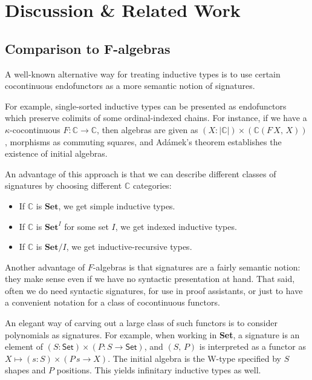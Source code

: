 \documentclass[12pt,a4paper,twoside,openany]{book}
\theoremstyle{remark}
\theoremstyle{definition}
\theoremstyle{theorem}
\newcommand{\mbb}[1]{\mathbb{#1}}
\newcommand{\mbf}[1]{\mathbf{#1}}
\newcommand{\Set}{\mathsf{Set}}
\begin{document}
\section{Discussion \& Related Work}

\subsection{Comparison to F-algebras}

A well-known alternative way for treating inductive types is to use certain
cocontinuous endofunctors as a more semantic notion of signatures.

For example, single-sorted inductive types can be presented as endofunctors
which preserve colimits of some ordinal-indexed chains. For instance, if we have
a $\kappa$-cocontinuous $F : \mbb{C} \to \mbb{C}$, then algebras are given as
$(X : |\mbb{C}|) \times (\mbb{C}(F\,X,\,X))$, morphisms as commuting squares,
and Adámek's theorem \cite{adamek} establishes the existence of initial
algebras.

An advantage of this approach is that we can describe different classes of
signatures by choosing different $\mbb{C}$ categories:
\begin{itemize}
  \item If $\mbb{C}$ is $\mbf{Set}$, we get simple inductive types.
  \item If $\mbb{C}$ is $\mbf{Set}^I$ for some set $I$, we get indexed inductive types.
  \item If $\mbb{C}$ is $\mbf{Set}/I$, we get inductive-recursive types.
\end{itemize}

Another advantage of $F$-algebras is that signatures are a fairly semantic
notion: they make sense even if we have no syntactic presentation at hand. That
said, often we do need syntactic signatures, for use in proof assistants, or
just to have a convenient notation for a class of cocontinuous functors.

An elegant way of carving out a large class of such functors is to
consider polynomials as signatures. For example, when working in \textbf{Set}, a
signature is an element of $(S : \Set) \times (P : S \to \Set)$, and $(S,\,P)$
is interpreted as a functor as $X \mapsto (s : S) \times (P\,s \to X)$. The
initial algebra is the W-type specified by $S$ shapes and $P$ positions. This
yields infinitary inductive types as well.
\end{document}
